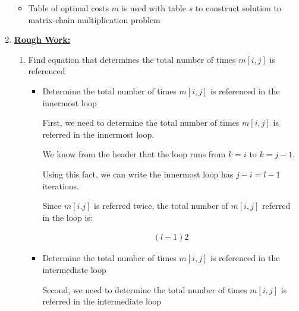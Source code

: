 \documentclass[12pt]{article}
\begin{document}
\begin{enumerate}[1.]
\begin{itemize}
        \bigskip

        \item Table of optimal costs $m$ is used with table $s$ to construct solution to
        matrix-chain multiplication problem

    \end{itemize}

    \item

    \bigskip

    \underline{\textbf{Rough Work:}}
    \setcounter{equation}{0}
    \bigskip

    \begin{enumerate}[1.]
        \item Find equation that determines the total number of times $m[i,j]$ is referenced

        \begin{itemize}
            \item Determine the total number of times $m[i,j]$ is referenced in the
            innermost loop

            \bigskip

            First, we need to determine the total number of times $m[i,j]$ is referred in the
            innermost loop.

            \begin{mdframed}
            We know from the header that the loop runs from $k = i$ to $k = j - 1$.

            \bigskip

            Using this fact, we can write the innermost loop has $j - i = l - 1$ iterations.

            \bigskip

            Since $m[i.j]$ is referred twice, the total number of $m[i,j]$ referred
            in the loop is:

            \begin{align}
                (l - 1)2
            \end{align}

            \end{mdframed}

            \item Determine the total number of times $m[i,j]$ is referenced in the
            intermediate loop

            \bigskip

            Second, we need to determine the total number of times $m[i,j]$ is referred in the
            intermediate loop


\end{itemize}
\end{enumerate}
\end{enumerate}
\end{document}

